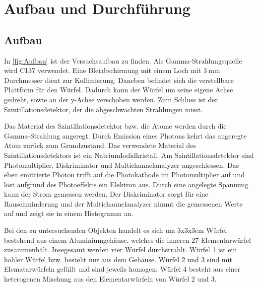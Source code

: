 \section{Aufbau und Durchführung}
\label{sec:Durchführung}

\subsection{Aufbau}
In \autoref{fig:Aufbau} ist der Versuchsaufbau zu finden.
Als Gamma-Strahlungsquelle wird C137 verwendet.
Eine Bleiabschirmung mit einem Loch mit $\SI{3}{\milli\metre}$ Durchmesser dient zur Kollimierung.
Daneben befindet sich die verstellbare Plattform für den Würfel.
Dadurch kann der Würfel um seine eigene Achse gedreht, sowie an der y-Achse verschoben werden.
Zum Schluss ist der Szintillationsdetektor, der die abgeschwächten Strahlungen misst.

Das Material des Szintillationsdetektor bzw. die Atome werden durch die Gamma-Strahlung angeregt.
Durch Emission eines Photons kehrt das angeregte Atom zurück zum Grundzustand.
Das verwendete Material des Szintillationsdetektors ist ein NatriumIodidkristall.
Am Szintillationsdetektor sind Photomultiplier, Diskriminator und Multichannelanalyzer angeschlossen.
Das eben emittierte Photon trifft auf die Photokathode im Photomultiplier auf und löst aufgrund des Photoeffekts ein Elektron aus.
Durch eine angelegte Spannung kann der Strom gemessen werden.
Der Diskriminator sorgt für eine Rauschminderung und der Multichannelanalyzer nimmt die gemessenen  Werte auf und zeigt sie in einem Histogramm an.

Bei den zu untersuchenden Objekten handelt es sich um 3x3x3cm Würfel bestehend aus einem Aluminiumgehäuse, welches die inneren 27 Elementarwürfel zusammenhält.
Insegesamt werden vier Würfel durchstrahlt.
Würfel 1 ist ein hohler Würfel bzw. besteht nur aus dem Gehäuse.
Würfel 2 und 3 sind mit Elematarwürfeln gefüllt und sind jeweils homogen.
Würfel 4 besteht aus einer heterogenen Mischung aus den Elementarwürfeln von Würfel 2 und 3.


